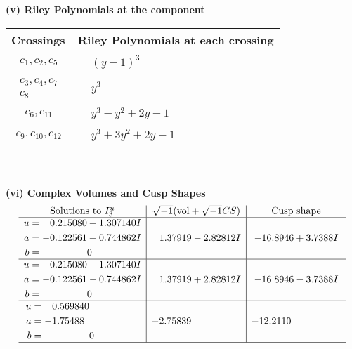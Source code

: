 \documentclass[1p]{elsarticle_modified}
\theoremstyle{definition}
\newcommand{\I}{\sqrt{-1}}
\begin{document}
\newpage\renewcommand{\arraystretch}{1}
\flushleft \textbf{(v) Riley Polynomials at the component}\newline \\
\begin{tabular}{m{50pt}|m{274pt}}
Crossings & \hspace{64pt}Riley Polynomials at each crossing \\
\hline $$\begin{aligned}c_{1},c_{2},c_{5}\end{aligned}$$&$\begin{aligned}
&(y-1)^3
\end{aligned}$\\
\hline $$\begin{aligned}c_{3},c_{4},c_{7}\\c_{8}\end{aligned}$$&$\begin{aligned}
&y^3
\end{aligned}$\\
\hline $$\begin{aligned}c_{6},c_{11}\end{aligned}$$&$\begin{aligned}
&y^3- y^2+2 y-1
\end{aligned}$\\
\hline $$\begin{aligned}c_{9},c_{10},c_{12}\end{aligned}$$&$\begin{aligned}
&y^3+3 y^2+2 y-1
\end{aligned}$\\
\hline
\end{tabular}\\~\\
\newpage\flushleft \textbf{(vi) Complex Volumes and Cusp Shapes}
$$\begin{array}{c|c|c}  
\text{Solutions to }I^u_{3}& \I (\text{vol} + \sqrt{-1}CS) & \text{Cusp shape}\\
 \hline 
\begin{aligned}
u &= \phantom{-}0.215080 + 1.307140 I \\
a &= -0.122561 + 0.744862 I \\
b &= \phantom{-0.000000 } 0\end{aligned}
 & \phantom{-}1.37919 - 2.82812 I & -16.8946 + 3.7388 I \\ \hline\begin{aligned}
u &= \phantom{-}0.215080 - 1.307140 I \\
a &= -0.122561 - 0.744862 I \\
b &= \phantom{-0.000000 } 0\end{aligned}
 & \phantom{-}1.37919 + 2.82812 I & -16.8946 - 3.7388 I \\ \hline\begin{aligned}
u &= \phantom{-}0.569840\phantom{ +0.000000I} \\
a &= -1.75488\phantom{ +0.000000I} \\
b &= \phantom{-0.000000 } 0\end{aligned}
 & -2.75839\phantom{ +0.000000I} & -12.2110\phantom{ +0.000000I}\\
 \hline 
 \end{array}$$\newpage
\end{document}
